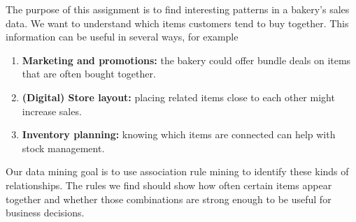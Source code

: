 \label{chap:business-understanding}

The purpose of this assignment is to find interesting patterns in a bakery's sales data. 
We want to understand which items customers tend to buy together. 
This information can be useful in several ways, for example\:

\begin{enumerate}
\item \textbf{Marketing and promotions:} 
the bakery could offer bundle deals on items that are often bought together.

\item \textbf{(Digital) Store layout:} 
placing related items close to each other might increase sales.

\item \textbf{Inventory planning:} 
knowing which items are connected can help with stock management.
\end{enumerate}

Our data mining goal is to use association rule mining to identify these kinds of relationships. The rules we find should show how often certain items appear together and whether those combinations are strong enough to be useful for business decisions.
